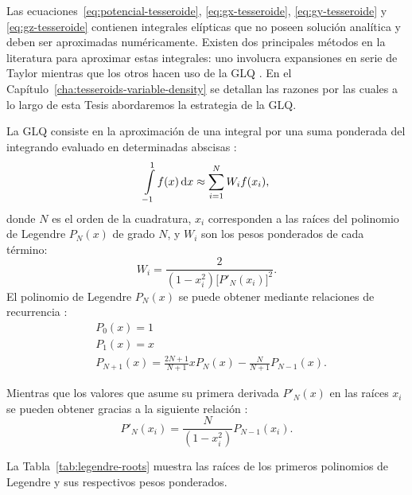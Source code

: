 Las ecuaciones~\ref{eq:potencial-tesseroide}, \ref{eq:gx-tesseroide},
\ref{eq:gy-tesseroide} y \ref{eq:gz-tesseroide} contienen integrales elípticas
que no poseen solución analítica y deben ser aproximadas numéricamente.
Existen dos principales métodos en la literatura para aproximar estas
integrales: uno involucra expansiones en serie de Taylor
\citep{heck2006,grombein2013} mientras que los otros hacen uso de la \ac{GLQ}
\citep{asgharzadeh2007,wildpfeiffer2008,li2011,uieda2016,lin2018}.
En el Capítulo~\ref{cha:tesseroids-variable-density} se detallan las razones
por las cuales a lo largo de esta Tesis abordaremos la estrategia de la
\ac{GLQ}.

La \Ac{GLQ} consiste en la aproximación de una integral por una suma ponderada
del integrando evaluado en determinadas abscisas
\citep[][p.~390]{hildebrand1987}:
%
\begin{equation}
    \int\limits_{-1}^1 f(x) \mathop{}\!\textnormal{d} x \approx
        \sum\limits_{i=1}^{N} W_i f(x_i),
\end{equation}
%
donde $N$ es el orden de la cuadratura,
$x_i$ corresponden a las raíces del polinomio de Legendre $P_N(x)$ de grado
$N$, y $W_i$ son los pesos ponderados de cada término:
%
\begin{equation}
    W_i = \frac{2}{(1 - x_i^2) \Big[ P'_N(x_i) \Big]^2}.
\end{equation}
%
El polinomio de Legendre $P_N(x)$ se puede obtener mediante
relaciones de recurrencia \citep[][p.~330]{hildebrand1987}:
%
\begin{align}
    &P_0(x) = 1 \\
    &P_1(x) = x \\
    &P_{N + 1}(x) = \frac{2N + 1}{N + 1} x P_N(x) - \frac{N}{N + 1}P_{N-1}(x).
\end{align}

\noindent
Mientras que los valores que asume su primera derivada $P'_N(x)$ en las raíces
$x_i$ se pueden obtener gracias a la siguiente relación
\citep[][p.~391]{hildebrand1987}:
%
\begin{equation}
    P'_N(x_i) = \frac{N}{(1 - x_i^2)} P_{N - 1}(x_i).
\end{equation}

La Tabla~\ref{tab:legendre-roots} muestra las raíces de los primeros polinomios
de Legendre y sus respectivos pesos ponderados.

